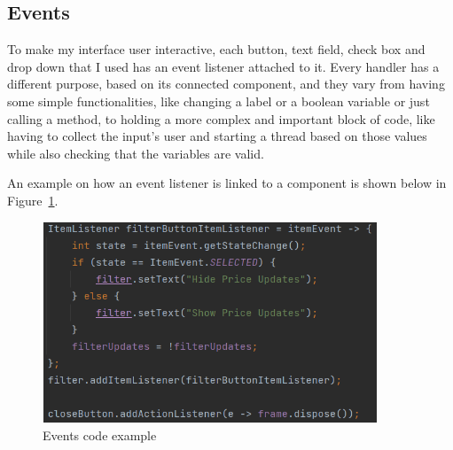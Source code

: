\documentclass[12pt,a4paper]{report}
\begin{document}
\subsection{Events}
To make my interface user interactive, each button, text field, check box and drop down that I used has an event listener attached to it. Every handler has a different purpose, based on its connected component, and they vary from having some simple functionalities, like changing a label or a boolean variable or just calling a method, to holding a more complex and important block of code, like having to collect the input's user and starting a thread based on those values while also checking that the variables are valid.  

An example on how an event listener is linked to a component is shown below in Figure~\ref{fig:events}.

\begin{figure}[!ht]
	\centering
	\includegraphics[width=10cm,height=6cm]{pics/events.png}
	\caption{Events code example}
	\label{fig:events}
\end{figure}
\end{document}
